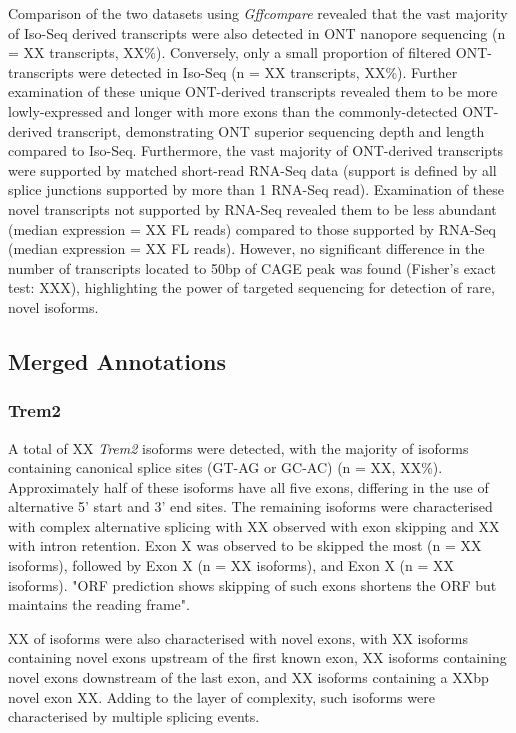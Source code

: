Comparison of the two datasets using \textit{Gffcompare} revealed that the vast majority of Iso-Seq derived transcripts were also detected in ONT nanopore sequencing (n = XX transcripts, XX\%). Conversely, only a small proportion of filtered ONT-transcripts were detected in Iso-Seq (n = XX transcripts, XX\%). Further examination of these unique ONT-derived transcripts revealed them to be more lowly-expressed and longer with more exons than the commonly-detected ONT-derived transcript, demonstrating ONT superior sequencing depth and length compared to Iso-Seq. Furthermore, the vast majority of ONT-derived transcripts were supported by matched short-read RNA-Seq data (support is defined by all splice junctions supported by more than 1 RNA-Seq read). Examination of these novel transcripts not supported by RNA-Seq revealed them to be less abundant (median expression = XX FL reads) compared to those supported by RNA-Seq (median expression = XX FL reads). However, no significant difference in the number of transcripts located to 50bp of CAGE peak was found (Fisher's exact test: XXX), highlighting the power of targeted sequencing for detection of rare, novel isoforms. 

\subsection{Merged Annotations}

\subsubsection{Trem2}
A total of XX \textit{Trem2} isoforms were detected, with the majority of isoforms containing canonical splice sites (GT-AG or GC-AC) (n = XX, XX\%). Approximately half of these isoforms have all five exons, differing in the use of alternative 5' start and 3' end sites. The remaining isoforms were characterised with complex alternative splicing with XX observed with exon skipping and XX with intron retention. Exon X was observed to be skipped the most (n = XX isoforms), followed by Exon X (n = XX isoforms), and Exon X (n = XX isoforms). "ORF prediction shows skipping of such exons shortens the ORF but maintains the reading frame". 

XX of isoforms were also characterised with novel exons, with XX isoforms containing novel exons upstream of the first known exon, XX isoforms containing novel exons downstream of the last exon, and XX isoforms containing a XXbp novel exon XX. Adding to the layer of complexity, such isoforms were characterised by multiple splicing events. 

